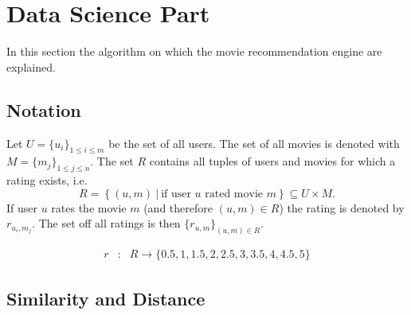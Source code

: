 \documentclass{article}
\begin{document}
\section{Data Science Part}

In this section the algorithm on which the movie recommendation engine are explained.

\subsection{Notation}

Let $U = \{ u_i \}_{1 \leq i \leq m}$ be the set of all users. The set of all movies is denoted with $M = \{ m_j \}_{1 \leq j \leq n}$. The set $R$ contains all tuples of users and movies for which a rating exists, i.e.
\[ R = \left\{ (u, m)~|~\textrm{if user }u\textrm{ rated movie }m\right\}\subseteq U\times M.\]
If user $u$ rates the movie $m$ (and therefore $(u,m)\in R$)  the rating is denoted by $r_{u_i, m_j}$. The set off all ratings is then $\{ r_{u, m}\}_{(u,m)\in R}$.

\begin{eqnarray}
r &:& R \rightarrow \{0.5, 1, 1.5, 2, 2.5, 3, 3.5, 4, 4.5, 5\}\nonumber
\end{eqnarray}


\subsection{Similarity and Distance}
\end{document}
